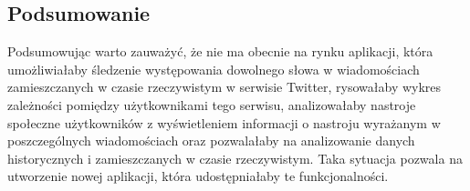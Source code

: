 \subsection{Podsumowanie}

Podsumowując warto zauważyć, że nie ma obecnie na rynku aplikacji, która umożliwiałaby śledzenie występowania dowolnego słowa w wiadomościach zamieszczanych w czasie rzeczywistym w serwisie Twitter, rysowałaby wykres zależności pomiędzy użytkownikami tego serwisu, analizowałaby nastroje społeczne użytkowników z wyświetleniem informacji o nastroju wyrażanym w poszczególnych wiadomościach oraz pozwalałaby na analizowanie danych historycznych i zamieszczanych w czasie rzeczywistym. Taka sytuacja pozwala na utworzenie nowej aplikacji, która udostępniałaby te funkcjonalności. 